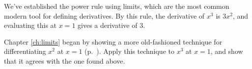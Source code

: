 We've established the power rule using limits, which are the most
common modern tool for defining derivatives. By this rule, the
derivative of $x^3$ is $3x^2$, and evaluating this at $x=1$ gives
a derivative of 3.

Chapter \ref{ch:limits} began by showing a more old-fashioned technique
for differentiating $x^2$ at $x=1$ (p.~\pageref{discard-dx-squared}). Apply this
technique to $x^3$ at $x=1$, and show that it agrees with the one found above.

